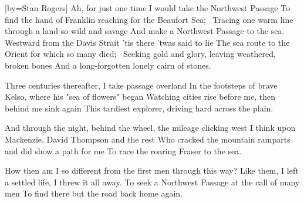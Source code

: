 [by={Stan Rogers}]
\beginchorus \singlespacing
Ah, for just one time I would take the Northwest Passage
To find the hand of Franklin reaching for the Beaufort Sea; 
Tracing one warm line through a land so wild and savage
And make a Northwest Passage to the sea.
\endchorus
\beginverse \singlespacing
Westward from the Davis Strait 'tis there 'twas said to lie
The sea route to the Orient for which so many died; 
Seeking gold and glory, leaving weathered, broken bones
And a long-forgotten lonely cairn of stones.
\endverse
{}

\beginverse \singlespacing
Three centuries thereafter, I take passage overland
In the footsteps of brave Kelso, where his "sea of flowers" began
Watching cities rise before me, then behind me sink again
This tardiest explorer, driving hard across the plain.
\endverse
{}

\beginverse \singlespacing
And through the night, behind the wheel, the mileage clicking west
I think upon Mackenzie, David Thompson and the rest
Who cracked the mountain ramparts and did show a path for me
To race the roaring Fraser to the sea.
\endverse
{}

\beginverse \singlespacing
How then am I so different from the first men through this way?
Like them, I left a settled life, I threw it all away.
To seek a Northwest Passage at the call of many men
To find there but the road back home again.
\endverse
{}

\vspace{30mm}

\endsong
